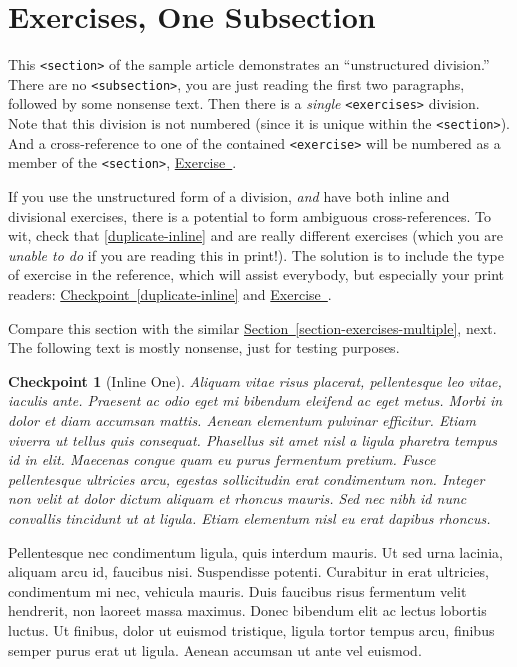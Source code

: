 \documentclass[pdflatex]{sn-jnl}
\theoremstyle{thmstyleone}%
\theoremstyle{thmstyletwo}%
\newtheorem{inlineexercise}[theorem]{Checkpoint}
\theoremstyle{thmstylethree}%
\newcommand{\xreffont}{\relax}
\newcommand{\mono}[1]{\texttt{#1}}
\numberwithin{equation}{section}
\begin{document}
\section{Exercises, One Subsection}\label{section-exercises-single}%
This \mono{<section>} of the sample article demonstrates an ``unstructured division.''  There are no \mono{<subsection>}, you are just reading the first two paragraphs, followed by some nonsense text.  Then there is a \emph{single} \mono{<exercises>} division.  Note that this division is not numbered (since it is unique within the \mono{<section>}).  And a cross-reference to one of the contained \mono{<exercise>} will be numbered as a member of the \mono{<section>}, \hyperlink{exercise-challenging-one-unstructured}{Exercise~{\xreffont 36.4}}.%
\par
If you use the unstructured form of a division, \emph{and} have both inline and divisional exercises, there is a potential to form ambiguous cross-references.  To wit, check that \hyperref[duplicate-inline]{{\xreffont\ref{duplicate-inline}}} and \hyperlink{duplicate-divisional}{{\xreffont 36.2}} are really different exercises (which you are \emph{unable to do} if you are reading this in print!).  The solution is to include the type of exercise in the reference, which will assist everybody, but especially your print readers:  \hyperref[duplicate-inline]{Checkpoint~{\xreffont\ref{duplicate-inline}}} and \hyperlink{duplicate-divisional}{Exercise~{\xreffont 36.2}}.%
\par
Compare this section with the similar \hyperref[section-exercises-multiple]{Section~{\xreffont\ref{section-exercises-multiple}}}, next.  The following text is mostly nonsense, just for testing purposes.%
\begin{inlineexercise}[Inline One]\label{section-exercises-single-5}%
%
Aliquam vitae risus placerat, pellentesque leo vitae, iaculis ante. Praesent ac odio eget mi bibendum eleifend ac eget metus. Morbi in dolor et diam accumsan mattis. Aenean elementum pulvinar efficitur. Etiam viverra ut tellus quis consequat. Phasellus sit amet nisl a ligula pharetra tempus id in elit. Maecenas congue quam eu purus fermentum pretium. Fusce pellentesque ultricies arcu, egestas sollicitudin erat condimentum non. Integer non velit at dolor dictum aliquam et rhoncus mauris. Sed nec nibh id nunc convallis tincidunt ut at ligula. Etiam elementum nisl eu erat dapibus rhoncus.%
\end{inlineexercise}%
Pellentesque nec condimentum ligula, quis interdum mauris. Ut sed urna lacinia, aliquam arcu id, faucibus nisi. Suspendisse potenti. Curabitur in erat ultricies, condimentum mi nec, vehicula mauris. Duis faucibus risus fermentum velit hendrerit, non laoreet massa maximus. Donec bibendum elit ac lectus lobortis luctus. Ut finibus, dolor ut euismod tristique, ligula tortor tempus arcu, finibus semper purus erat ut ligula. Aenean accumsan ut ante vel euismod.%
\end{document}
